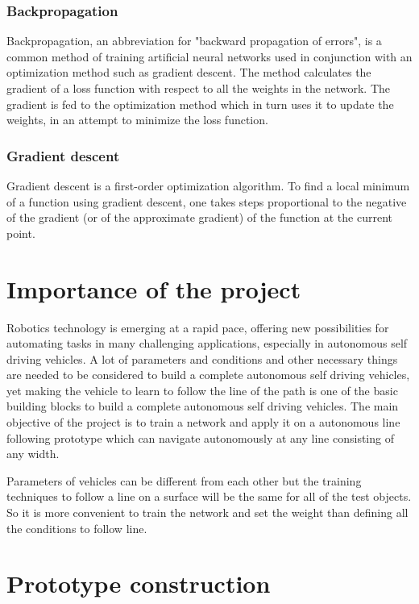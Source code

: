 \documentclass[14pt,a4paper]{extarticle}
\begin{document}
		
	\subsubsection{Backpropagation}
	
	Backpropagation, an abbreviation for "backward propagation of errors", is a common method of training artificial neural networks used in conjunction with an optimization method such as gradient descent. The method calculates the gradient of a loss function with respect to all the weights in the network. The gradient is fed to the optimization method which in turn uses it to update the weights, in an attempt to minimize the loss function.
	
	\subsubsection{Gradient descent}
	Gradient descent is a first-order optimization algorithm. To find a local minimum of a function using gradient descent, one takes steps proportional to the negative of the gradient (or of the approximate gradient) of the function at the current point.


	\section{Importance of the project}
	
	Robotics technology is emerging at a rapid pace, offering new possibilities for automating tasks in many challenging applications, especially in autonomous self driving vehicles. A lot of parameters and conditions and other necessary things are needed to be considered to build a complete autonomous self driving vehicles, yet making the vehicle to learn to follow the line of the path is one of the basic building blocks to build a complete autonomous self driving vehicles. The main objective of the project is to train a network and apply it on a autonomous line following prototype which can navigate autonomously at any line consisting of any width. 
	
	Parameters of vehicles can be different from each other but the training techniques to follow a line on a surface will be the same for all of the test objects. So it is more convenient to train the network and set the weight than defining all the conditions to follow line.
	
	
	\section{Prototype construction}
	
\end{document}
